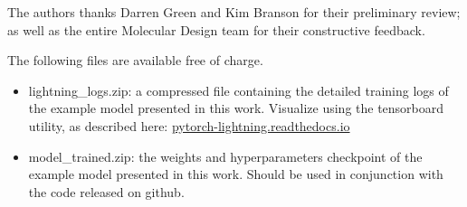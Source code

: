 \documentclass[journal=jacsat,manuscript=article]{achemso}
\begin{document}
\begin{acknowledgement}

The authors thanks Darren Green and Kim Branson for their preliminary review; as well as the entire Molecular Design team for their constructive feedback.

\end{acknowledgement}

\begin{suppinfo}

The following files are available free of charge.
\begin{itemize}
  \item lightning\_logs.zip: a compressed file containing the detailed training logs of the example model presented in this work. Visualize using the tensorboard utility, as described here: \href{https://pytorch-lightning.readthedocs.io/en/stable/starter/introduction_guide.html}{pytorch-lightning.readthedocs.io}
  \item model\_trained.zip: the weights and hyperparameters checkpoint of the example model presented in this work. Should be used in conjunction with the code released on github.
\end{itemize}

\end{suppinfo}

%

\end{document}
